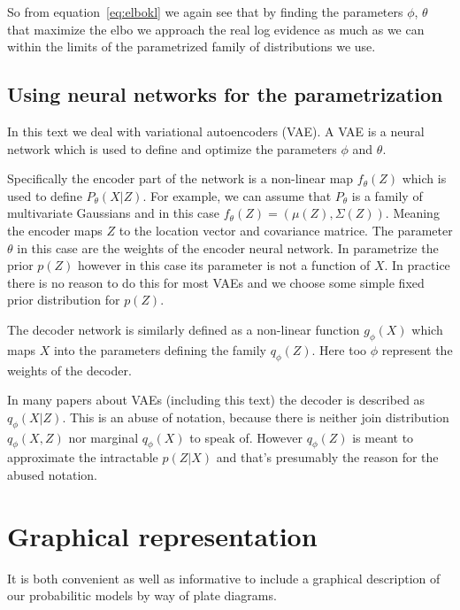 \documentclass[11pt, a4paper]{report}
\theoremstyle{plain}
\theoremstyle{definition}
\theoremstyle{remark}
\begin{document}
So from equation~\ref{eq:elbokl} we again see that by finding the parameters
$\phi$, $\theta$ that maximize the elbo we approach the real log evidence as much
as we can within the limits of the parametrized family of distributions we use.

\subsection{Using neural networks for the parametrization}
In this text we deal with variational autoencoders (VAE).
A VAE is a neural network which is used to define and optimize the parameters
$\phi$ and $\theta$.

Specifically the encoder part of the network is a non-linear map $f_{\theta}(Z)$ which is
used to define $P_{\theta}(X|Z)$. For example, we can assume that $P_{\theta}$
is a family of multivariate Gaussians and in this case $f_{\theta}(Z) =
(\mu(Z), \Sigma(Z))$. Meaning the encoder maps $Z$ to the location vector and
covariance matrice. The parameter $\theta$ in this case are the weights of the
encoder neural network. In parametrize the prior $p(Z)$ however in this case its
parameter is not a function of $X$. In practice there is no reason to do this
for most VAEs and we choose some simple fixed prior distribution for $p(Z)$.

The decoder network is similarly defined as a non-linear function $g_{\phi}(X)$ which
maps $X$ into the parameters defining the family $q_{\phi}(Z)$. Here too $\phi$
represent the weights of the decoder.

\remark{}\label{rem:abuse_of_notation}
In many papers about VAEs (including this text) the decoder is described as
$q_{\phi}(X | Z)$. This is an abuse of notation, because there is neither 
join distribution $q_{\phi}(X,Z)$ nor marginal $q_{\phi}(X)$ to speak of.
However $q_{\phi}(Z)$ is meant to approximate the intractable $p(Z|X)$ and
that's presumably the reason for the abused notation.


\section{Graphical representation}


It is both convenient as well as informative to include a graphical description
of our probabilitic models by way of plate diagrams.
\end{document}
